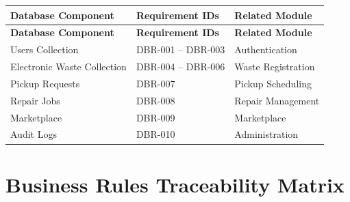 \begin{longtable}{|p{5cm}|p{4cm}|p{4cm}|}

\hline
\textbf{Database Component} &
\textbf{Requirement IDs} &
\textbf{Related Module} \\
\hline
\endfirsthead

\hline
\textbf{Database Component} &
\textbf{Requirement IDs} &
\textbf{Related Module} \\
\hline
\endhead

Users Collection &
DBR-001 -- DBR-003 &
Authentication \\
\hline

Electronic Waste Collection &
DBR-004 -- DBR-006 &
Waste Registration \\
\hline

Pickup Requests &
DBR-007 &
Pickup Scheduling \\
\hline

Repair Jobs &
DBR-008 &
Repair Management \\
\hline

Marketplace &
DBR-009 &
Marketplace \\
\hline

Audit Logs &
DBR-010 &
Administration \\
\hline

\end{longtable}

\section{Business Rules Traceability Matrix}

